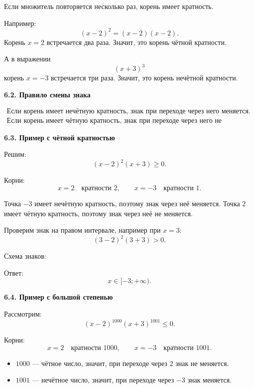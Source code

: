\documentclass[a4paper,12pt]{article}
\newcommand{\subsectiontitle}[1]{%
  \vspace{0.5em}
  {\large\bfseries\textcolor{darkaccent}{#1}}\par
  \vspace{0.15em}
}
\newcommand{\closedpoint}[2]{\filldraw[accent] (#1,0) circle (2.2pt) node[below=6pt, text=black] {$#2$};}
\begin{document}
Если множитель повторяется несколько раз, корень имеет кратность.

Например:
\[
(x-2)^2=(x-2)(x-2).
\]
Корень $x=2$ встречается два раза. Значит, это корень чётной кратности.

А в выражении
\[
(x+3)^3
\]
корень $x=-3$ встречается три раза. Значит, это корень нечётной кратности.

\subsectiontitle{6.2. Правило смены знака}

\[
\boxed{
\begin{array}{l}
\text{Если корень имеет нечётную кратность, знак при переходе через него меняется.}\\
\text{Если корень имеет чётную кратность, знак при переходе через него не меняется.}
\end{array}
}
\]

\subsectiontitle{6.3. Пример с чётной кратностью}

Решим:
\[
(x-2)^2(x+3)\ge 0.
\]

Корни:
\[
x=2 \quad \text{кратности }2,\qquad x=-3 \quad \text{кратности }1.
\]

Точка $-3$ имеет нечётную кратность, поэтому знак через неё меняется.  
Точка $2$ имеет чётную кратность, поэтому знак через неё не меняется.

Проверим знак на правом интервале, например при $x=3$:
\[
(3-2)^2(3+3)>0.
\]

Схема знаков:

\begin{center}
\end{center}

Ответ:
\[
x\in[-3;+\infty).
\]

\subsectiontitle{6.4. Пример с большой степенью}

Рассмотрим:
\[
(x-2)^{1000}(x+3)^{1001}\le 0.
\]

Корни:
\[
x=2 \quad \text{кратности }1000,
\qquad
x=-3 \quad \text{кратности }1001.
\]

\begin{itemize}
  \item $1000$ — чётное число, значит, при переходе через $2$ знак не меняется.
  \item $1001$ — нечётное число, значит, при переходе через $-3$ знак меняется.
\end{itemize}
\end{document}
